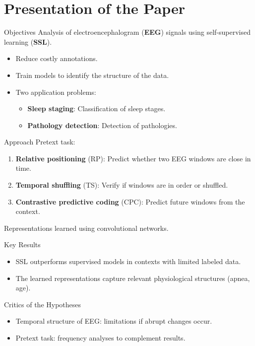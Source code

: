 \section{Presentation of the Paper}

\begin{frame}{Objectives}
Analysis of electroencephalogram (\textbf{EEG}) signals using self-supervised learning (\textbf{SSL}).
\begin{itemize}
    \item Reduce costly annotations.
    \item Train models to identify the structure of the data.
    \item Two application problems:
    \begin{itemize}
        \item \textbf{Sleep staging}: Classification of sleep stages.
        \item \textbf{Pathology detection}: Detection of pathologies.
    \end{itemize}
\end{itemize}
\end{frame}

\begin{frame}{Approach}
Pretext task:
    \begin{enumerate}
        \item \textbf{Relative positioning} (RP): Predict whether two EEG windows are close in time.
        \item \textbf{Temporal shuffling} (TS): Verify if windows are in order or shuffled.
        \item \textbf{Contrastive predictive coding} (CPC): Predict future windows from the context.
    \end{enumerate}
Representations learned using convolutional networks.
\end{frame}

\begin{frame}{Key Results}
\begin{itemize}
    \item SSL outperforms supervised models in contexts with limited labeled data.
    \item The learned representations capture relevant physiological structures (apnea, age).
\end{itemize}
\end{frame}

\begin{frame}{Critics of the Hypotheses}
\begin{itemize}
    \item Temporal structure of EEG: limitations if abrupt changes occur.
    \item Pretext task: frequency analyses to complement results.
\end{itemize}
\end{frame}
